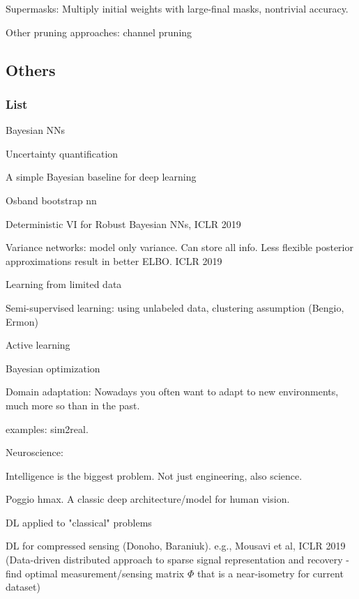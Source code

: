 \documentclass[english]{article}
\begin{document}
Supermasks: Multiply initial weights with large-final masks, nontrivial accuracy. 

\item Other pruning approaches: channel pruning

\eenum


\subsection{Others}


\subsubsection{List}


\benum 


\item Bayesian NNs

Uncertainty quantification

A simple Bayesian baseline for deep learning

Osband bootstrap nn

Deterministic VI for Robust Bayesian NNs, ICLR 2019

Variance networks: model only variance. Can store all info. Less flexible posterior approximations result in better ELBO. ICLR 2019

\item Learning from limited data

 Semi-supervised learning: using unlabeled data, clustering assumption (Bengio, Ermon)

 Active learning

\item Bayesian optimization

\item Domain adaptation: Nowadays you often want to adapt to new environments, much more so than in the past. 

examples: sim2real. 

\item Neuroscience: 

Intelligence is the biggest problem. Not just engineering, also science. 

Poggio hmax. A classic deep architecture/model for human vision.

\item DL applied to "classical" problems

DL for compressed sensing (Donoho, Baraniuk). e.g., Mousavi et al, ICLR 2019 (Data-driven distributed approach to sparse signal representation and recovery - find optimal measurement/sensing matrix $\Phi$ that is a near-isometry for current dataset)
\end{document}

